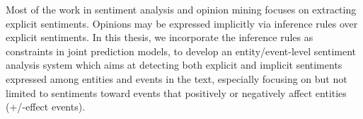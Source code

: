 Most of the work in sentiment analysis and opinion mining focuses on extracting explicit sentiments. Opinions may be expressed implicitly via inference rules over explicit sentiments. In this thesis, we incorporate the inference rules as constraints in joint prediction models, to develop an entity/event-level sentiment analysis system which aims at detecting both explicit and implicit sentiments expressed among entities and events in the text, especially focusing on but not limited to sentiments toward events that positively or negatively affect entities (+/-effect events).
